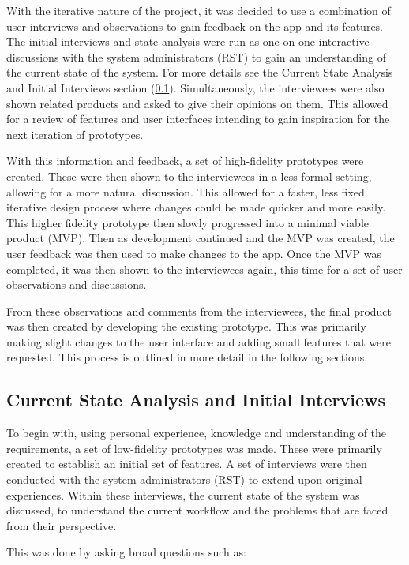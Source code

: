\documentclass [11pt,a4paper]{article}
\begin{document}
With the iterative nature of the project, it was decided to use a combination of user interviews and observations to gain feedback on the app and its features. The initial interviews and state analysis were run as one-on-one interactive discussions with the system administrators (RST) to gain an understanding of the current state of the system. For more details see the Current State Analysis and Initial Interviews section (\ref{sec:current_state_analysis}). Simultaneously, the interviewees were also shown related products and asked to give their opinions on them. This allowed for a review of features and user interfaces intending to gain inspiration for the next iteration of prototypes. 

With this information and feedback, a set of high-fidelity prototypes were created. These were then shown to the interviewees in a less formal setting, allowing for a more natural discussion. This allowed for a faster, less fixed iterative design process where changes could be made quicker and more easily. This higher fidelity prototype then slowly progressed into a minimal viable product (MVP). Then as development continued and the MVP was created, the user feedback was then used to make changes to the app. Once the MVP was completed, it was then shown to the interviewees again, this time for a set of user observations and discussions. 

From these observations and comments from the interviewees, the final product was then created by developing the existing prototype. This was primarily making slight changes to the user interface and adding small features that were requested. This process is outlined in more detail in the following sections.

\subsection{Current State Analysis and Initial Interviews}
\label{sec:current_state_analysis}

To begin with, using personal experience, knowledge and understanding of the requirements, a set of low-fidelity prototypes was made. These were primarily created to establish an initial set of features. A set of interviews were then conducted with the system administrators (RST) to extend upon original experiences.  Within these interviews, the current state of the system was discussed, to understand the current workflow and the problems that are faced from their perspective.

This was done by asking broad questions such as:
\end{document}
